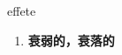 
\begin{frame}
{\huge effete}
\begin{center}
\begin{enumerate}\Large
  \item \textbf{衰弱的，衰落的}
\end{enumerate}
\end{center}
\end{frame}
